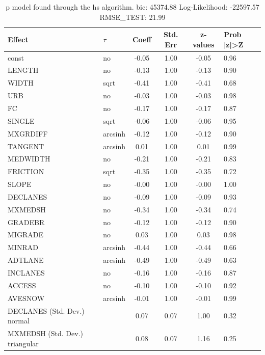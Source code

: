 \begin{table}
	\caption{p model found through the hs algorithm. bic: 45374.88 Log-Likelihood: -22597.57 RMSE_TEST: 21.99}
	\begin{center}
		\begin{tabular}{|l|l|c|c|c|l|}
			\hline
			Effect & $\tau$ & Coeff & Std. Err & z-values & Prob |z|>Z \\
			\hline
			const & no & -0.05 & 1.00 & -0.05 & 0.96 \\
			\hline
			LENGTH & no & -0.13 & 1.00 & -0.13 & 0.90 \\
			\hline
			WIDTH & sqrt & -0.41 & 1.00 & -0.41 & 0.68 \\
			\hline
			URB & no & -0.03 & 1.00 & -0.03 & 0.98 \\
			\hline
			FC & no & -0.17 & 1.00 & -0.17 & 0.87 \\
			\hline
			SINGLE & sqrt & -0.06 & 1.00 & -0.06 & 0.95 \\
			\hline
			MXGRDIFF & arcsinh & -0.12 & 1.00 & -0.12 & 0.90 \\
			\hline
			TANGENT & arcsinh & 0.01 & 1.00 & 0.01 & 0.99 \\
			\hline
			MEDWIDTH & no & -0.21 & 1.00 & -0.21 & 0.83 \\
			\hline
			FRICTION & sqrt & -0.35 & 1.00 & -0.35 & 0.72 \\
			\hline
			SLOPE & no & -0.00 & 1.00 & -0.00 & 1.00 \\
			\hline
			DECLANES & no & -0.09 & 1.00 & -0.09 & 0.93 \\
			\hline
			MXMEDSH & no & -0.34 & 1.00 & -0.34 & 0.74 \\
			\hline
			GRADEBR & no & -0.12 & 1.00 & -0.12 & 0.90 \\
			\hline
			MIGRADE & no & 0.03 & 1.00 & 0.03 & 0.98 \\
			\hline
			MINRAD & arcsinh & -0.44 & 1.00 & -0.44 & 0.66 \\
			\hline
			ADTLANE & arcsinh & -0.49 & 1.00 & -0.49 & 0.63 \\
			\hline
			INCLANES & no & -0.16 & 1.00 & -0.16 & 0.87 \\
			\hline
			ACCESS & no & -0.10 & 1.00 & -0.10 & 0.92 \\
			\hline
			AVESNOW & arcsinh & -0.01 & 1.00 & -0.01 & 0.99 \\
			\hline
			DECLANES (Std. Dev.) normal &  & 0.07 & 0.07 & 1.00 & 0.32 \\
			\hline
			MXMEDSH (Std. Dev.) triangular &  & 0.08 & 0.07 & 1.16 & 0.25 \\

\end{tabular}
\end{center}
\end{table}

